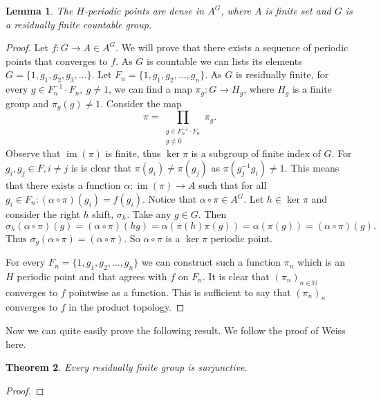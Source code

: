 \documentclass[titlepage, a4paper]{article}
\newcommand{\N}{\mathbb{N}}
\DeclareMathOperator{\im}{im}
\newtheorem{theorem}{Theorem}[section]
\newtheorem{lemma}[theorem]{Lemma}
\theoremstyle{remark}
\begin{document}
    \begin{lemma} \label{lem:h-periodic_points}
    The $H$-periodic points are dense in $A^G$, where $A$ is finite set and $G$ is a residually finite countable group.
    \end{lemma}
    \begin{proof}
        Let $f:G \to A \in A^G$. We will prove that there exists a sequence of periodic points that converges to $f$. As $G$ is countable we can lists its elements $G = \{1, g_1, g_2, g_3,\dots\}$. 
        Let $F_n = \{1, g_1, g_2, \dots, g_n\}$. 
        As $G$ is residually finite, for every $g \in F_n^{-1} \cdot F_n,\ g \ne 1$, we can find a map $\pi_g: G \to H_g$, where $H_g$ is a finite group and $\pi_g(g) \ne 1$.  Consider the map \[\pi = \prod_{ \substack{g\in  F_n^{-1} \cdot F_n\\ g\ne 0}} \pi_g
        .\]
        Observe that $\im(\pi)$ is finite, thus $\ker\pi$ is a subgroup of finite index of $G$. 
        For $g_i, g_j \in F, i \ne j$ is is clear that $\pi(g_i) \ne \pi(g_j)$ as $\pi(g_j^{-1} g_i) \ne 1$. 
        This means that there exists a function $\alpha: \im(\pi) \to A$ such that for all $g_i \in F_n: (\alpha \circ \pi)(g_i) = f(g_i)$. 
        Notice that $\alpha \circ \pi \in A^G$. 
        Let $h \in \ker\pi$ and consider the right $h$ shift, $\sigma_h$. 
        Take any $g \in G$. 
        Then 
        \[\sigma_h(\alpha\circ\pi)(g) = (\alpha \circ \pi)(hg) = \alpha(\pi(h)\pi(g)) = \alpha(\pi(g)) = (\alpha\circ\pi)(g).\] Thus $\sigma_g(\alpha \circ \pi) = (\alpha\circ\pi)$.
        So $\alpha\circ\pi$ is a $\ker\pi$ periodic point. 

        For every $F_n =  \{1, g_1, g_2, \dots, g_n\}$ we can construct such a function $\pi_n$ which is an $H$ periodic point and that agrees with $f$ on $F_n$. It is clear that $(\pi_n)_{n\in\N}$ converges to $f$ pointwise as a function. This is sufficient to say that $(\pi_n)_n$ converges to $f$ in the product topology.
    \end{proof}

    Now we can quite easily prove the following result. We follow the proof of Weiss \cite{weiss_2000} here.
    \begin{theorem} \label{thm:res_fin_surjunctive}
    Every residually finite group is surjunctive.
    \end{theorem}
    \begin{proof}
    
    \end{proof}
\end{document}
